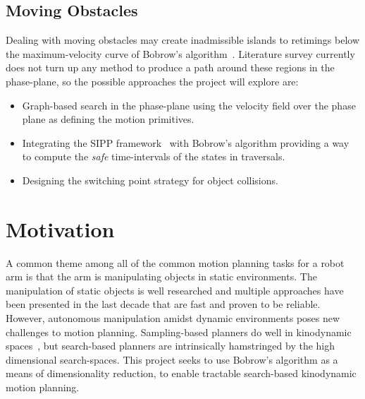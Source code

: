\documentclass[letterpaper,10pt]{article} %
\begin{document}
\subsection{Moving Obstacles}\label{subsec:movobs}
Dealing with moving obstacles may create inadmissible islands to retimings below the maximum-velocity curve of Bobrow's algorithm~\cite{shin1985minimum}. Literature survey currently does not turn up any method to produce a path around these regions in the phase-plane, so the possible approaches the project will explore are:

\begin{itemize}
\item Graph-based search in the phase-plane using the velocity field over the phase plane as defining the motion primitives.
\item Integrating the SIPP framework~\cite{phillips2011sipp} with Bobrow's algorithm providing a way to compute the \emph{safe} time-intervals of the states in traversals.
\item Designing the switching point strategy for object collisions.
\end{itemize}


\section{Motivation}

A common theme among all of the common motion planning tasks for a robot arm is that the arm is manipulating objects in static environments. The manipulation of static objects is well researched and multiple approaches have been presented in the last decade  that are fast and proven to be reliable. However, autonomous manipulation amidst dynamic environments poses new challenges to motion planning. Sampling-based planners do well in kinodynamic spaces~\cite{lavalle2001randomized}, but search-based planners are intrinsically hamstringed by the high dimensional search-spaces. This project seeks to use Bobrow's algorithm as a means of dimensionality reduction, to enable tractable search-based kinodynamic motion planning.






\end{document}
